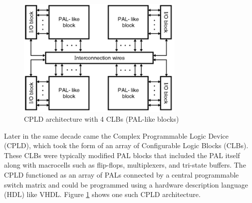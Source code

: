 \documentclass[twocolumn]{article}
\begin{document}
    \begin{figure}
        \centering
        \includegraphics[width=8.0cm]{figures/cpld.png}
        \caption{CPLD architecture with 4 CLBs (PAL-like blocks)}
        \label{fig:cpld}
    \end{figure}

    Later in the same decade came the Complex Programmable Logic Device (CPLD), which took the form of an array of Configurable Logic Blocks (CLBs). 
    These CLBs were typically modified PAL blocks that included the PAL itself along with macrocells such as flip-flops, multiplexers, and tri-state buffers. 
    The CPLD functioned as an array of PALs connected by a central programmable switch matrix and could be programmed using a hardware description language (HDL) like VHDL. 
    Figure \ref{fig:cpld} shows one such CPLD architecture. 
\end{document}
